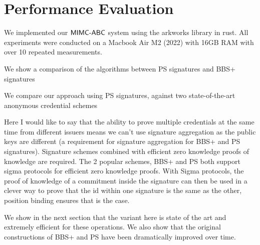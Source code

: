 \section{Performance Evaluation}
We implemented our $\mathsf{MIMC\text{-}ABC}$ system using the arkworks library \cite{arkworks_contributors_arkworks_2022} in rust. All experiments were conducted on a Macbook Air M2 (2022) with 16GB RAM with over 10 repeated measurements. 

We show a comparison of the algorithms between PS signatures and BBS+ signatures

We compare our approach using PS \cite{sako_short_2016} signatures, 
against two state-of-the-art anonymous credential schemes


Here I would like to say that the ability to prove multiple credentials at the same time from different issuers means we can't use signature aggregation as the public keys are different (a requirement for signature aggregation for BBS+ and PS signatures). Signature schemes combined with efficient zero knowledge proofs of knowledge are required. The 2 popular schemes, BBS+ and PS both support sigma protocols for efficient zero knowledge proofs. With Sigma protocols, the proof of knowledge of a commitment inside the signature can then be used in a clever way to prove that the id within one signature is the same as the other, position binding ensures that is the case. 

We show in the next section that the variant here is state of the art and extremely efficient for these operations. We also show that the original constructions of BBS+ and PS have been dramatically improved over time. 











